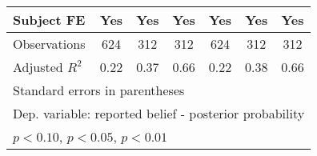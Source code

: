 \begin{table}[htbp]
\begin{tabular}{l*{6}{c}}
Subject FE      &      Yes         &      Yes         &      Yes         &      Yes         &      Yes         &      Yes         \\
\hline
Observations    &      624         &      312         &      312         &      624         &      312         &      312         \\
Adjusted \(R^{2}\)&     0.22         &     0.37         &     0.66         &     0.22         &     0.38         &     0.66         \\
\hline\hline
\multicolumn{7}{l}{\footnotesize Standard errors in parentheses}\\
\multicolumn{7}{l}{\footnotesize Dep. variable: reported belief - posterior probability}\\
\multicolumn{7}{l}{\footnotesize \sym{*} \(p<0.10\), \sym{**} \(p<0.05\), \sym{***} \(p<0.01\)}\\
\end{tabular}
\end{table}
